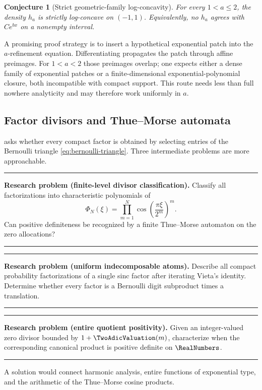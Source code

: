 \documentclass[11pt,oneside]{article}
\newtheorem{conjecture}[theorem]{Conjecture}
\theoremstyle{definition}
\theoremstyle{remark}
\newenvironment{boxedremark}{%
  \par\smallskip\noindent\begin{center}\begin{minipage}{0.94\textwidth}%
  \color{black}\hrule\vspace{0.6em}\small
}{%
  \vspace{0.6em}\hrule\end{minipage}\end{center}\smallskip
}
\begin{document}
\begin{conjecture}[Strict geometric-family log-concavity]\label{conj:strict-a}
For every $1<a\le2$, the density $h_a$ is strictly log-concave on $(-1,1)$.
Equivalently, no $h_a$ agrees with $Ce^{bx}$ on a nonempty interval.
\end{conjecture}

A promising proof strategy is to insert a hypothetical exponential patch into the
$a$-refinement equation.  Differentiating propagates the patch through affine
preimages.  For $1<a<2$ those preimages overlap; one expects either a dense family
of exponential patches or a finite-dimensional exponential-polynomial closure,
both incompatible with compact support.  This route needs less than full nowhere
analyticity and may therefore work uniformly in $a$.

\subsection{Factor divisors and Thue--Morse automata}
 asks whether every compact factor is obtained by
selecting entries of the Bernoulli triangle \eqref{eq:bernoulli-triangle}.  Three
intermediate problems are more approachable.

\begin{boxedremark}
\textbf{Research problem (finite-level divisor classification).}
Classify all factorizations into characteristic polynomials of
\[
 \Phi_N(\xi)=\prod_{m=1}^{N}\cos\!\left(\frac{\pi\xi}{2^m}\right)^m.
\]
Can positive definiteness be recognized by a finite Thue--Morse automaton on the
zero allocations?
\end{boxedremark}

\begin{boxedremark}
\textbf{Research problem (uniform indecomposable atoms).}
Describe all compact probability factorizations of a single sinc factor after
iterating Vieta's identity.  Determine whether every factor is a Bernoulli digit
subproduct times a translation.
\end{boxedremark}

\begin{boxedremark}
\textbf{Research problem (entire quotient positivity).}
Given an integer-valued zero divisor bounded by $1+\TwoAdicValuation(m)$, characterize when
the corresponding canonical product is positive definite on $\RealNumbers$.
\end{boxedremark}

A solution would connect harmonic analysis, entire functions of exponential type,
and the arithmetic of the Thue--Morse cosine products.
\end{document}
